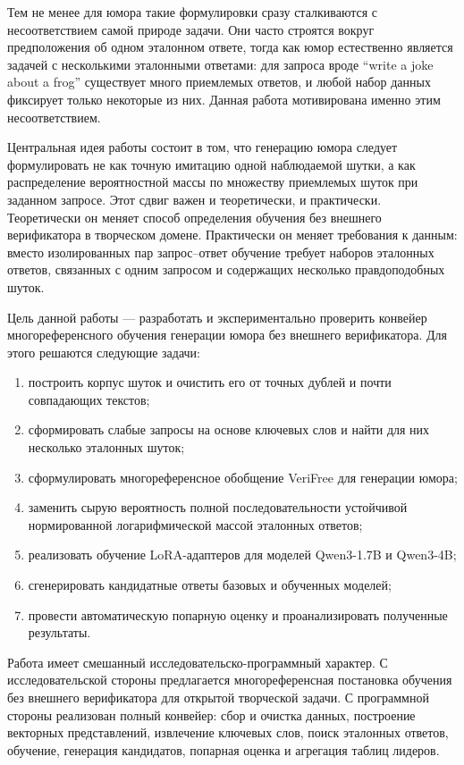 Тем не менее для юмора такие формулировки сразу сталкиваются с несоответствием самой природе задачи. Они часто строятся вокруг предположения об одном эталонном ответе, тогда как юмор естественно является задачей с несколькими эталонными ответами: для запроса вроде ``write a joke about a frog'' существует много приемлемых ответов, и любой набор данных фиксирует только некоторые из них. Данная работа мотивирована именно этим несоответствием.

Центральная идея работы состоит в том, что генерацию юмора следует формулировать не как точную имитацию одной наблюдаемой шутки, а как распределение вероятностной массы по множеству приемлемых шуток при заданном запросе. Этот сдвиг важен и теоретически, и практически. Теоретически он меняет способ определения обучения без внешнего верификатора в творческом домене. Практически он меняет требования к данным: вместо изолированных пар запрос--ответ обучение требует наборов эталонных ответов, связанных с одним запросом и содержащих несколько правдоподобных шуток.

Цель данной работы --- разработать и экспериментально проверить конвейер многореференсного обучения генерации юмора без внешнего верификатора. Для этого решаются следующие задачи:
\begin{enumerate}
    \item построить корпус шуток и очистить его от точных дублей и почти совпадающих текстов;
    \item сформировать слабые запросы на основе ключевых слов и найти для них несколько эталонных шуток;
    \item сформулировать многореференсное обобщение VeriFree для генерации юмора;
    \item заменить сырую вероятность полной последовательности устойчивой нормированной логарифмической массой эталонных ответов;
    \item реализовать обучение LoRA-адаптеров для моделей Qwen3-1.7B и Qwen3-4B;
    \item сгенерировать кандидатные ответы базовых и обученных моделей;
    \item провести автоматическую попарную оценку и проанализировать полученные результаты.
\end{enumerate}

Работа имеет смешанный исследовательско-программный характер. С исследовательской стороны предлагается многореференсная постановка обучения без внешнего верификатора для открытой творческой задачи. С программной стороны реализован полный конвейер: сбор и очистка данных, построение векторных представлений, извлечение ключевых слов, поиск эталонных ответов, обучение, генерация кандидатов, попарная оценка и агрегация таблиц лидеров.

